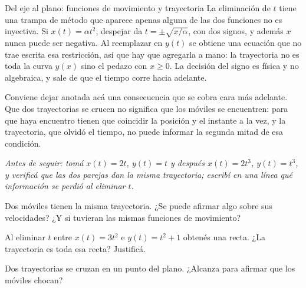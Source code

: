 \documentclass[11pt,openany]{book}
\begin{document}
\begin{bloque}{Del eje al plano: funciones de movimiento y trayectoria}
La eliminación de $t$ tiene una trampa de método que aparece apenas alguna de las dos funciones no es inyectiva. Si $x(t) = \alpha t^2$, despejar da $t = \pm\sqrt{x/\alpha}$, con dos signos, y además $x$ nunca puede ser negativa. Al reemplazar en $y(t)$ se obtiene una ecuación que no trae escrita esa restricción, así que hay que agregarla a mano: la trayectoria no es toda la curva $y(x)$ sino el pedazo con $x \geq 0$. La decisión del signo es física y no algebraica, y sale de que el tiempo corre hacia adelante.

Conviene dejar anotada acá una consecuencia que se cobra cara más adelante. Que dos trayectorias se crucen no significa que los móviles se encuentren: para que haya encuentro tienen que coincidir la posición y el instante a la vez, y la trayectoria, que olvidó el tiempo, no puede informar la segunda mitad de esa condición.

\textit{Antes de seguir: tomá $x(t) = 2t$, $y(t) = t$ y después $x(t) = 2t^3$, $y(t) = t^3$, y verificá que las dos parejas dan la misma trayectoria; escribí en una línea qué información se perdió al eliminar $t$.}
\end{bloque}

\begin{chequeo}
\item Dos móviles tienen la misma trayectoria. ¿Se puede afirmar algo sobre sus velocidades? ¿Y si tuvieran las mismas funciones de movimiento?
\item Al eliminar $t$ entre $x(t)=3t^2$ e $y(t)=t^2+1$ obtenés una recta. ¿La trayectoria es toda esa recta? Justificá.
\item Dos trayectorias se cruzan en un punto del plano. ¿Alcanza para afirmar que los móviles chocan?
\end{chequeo}
\end{document}
